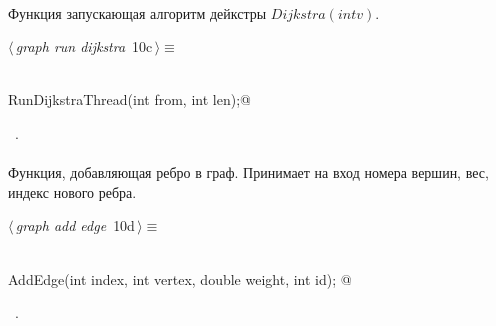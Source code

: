 \documentclass[12pt]{article}
\begin{document}
\paragraph{}
Функция запускающая алгоритм дейкстры $Dijkstra(int v)$.
\begin{flushleft} \small
\begin{minipage}{\linewidth}\label{scrap18}\raggedright\small
{} $\langle\,${\itshape graph run dijkstra}\nobreak\ {\footnotesize {10c}}$\,\rangle\equiv$
\vspace{-1ex}
\begin{list}{}{} \item
\mbox{}\verb@@\\
\mbox{}\verb@void RunDijkstraThread(int from, int len);@\\
\mbox{}\verb@@{\NWsep}
\end{list}
\vspace{-1.5ex}
\footnotesize
\begin{list}{}{\setlength{\itemsep}{-\parsep}\setlength{\itemindent}{-\leftmargin}}
\item \NWtxtMacroRefIn\ .

\item{}
\end{list}
\end{minipage}\vspace{4ex}
\end{flushleft}
\paragraph{}
Функция, добавляющая ребро в граф. Принимает на вход номера вершин, вес, индекс нового ребра.
\begin{flushleft} \small
\begin{minipage}{\linewidth}\label{scrap19}\raggedright\small
{} $\langle\,${\itshape graph add edge}\nobreak\ {\footnotesize {10d}}$\,\rangle\equiv$
\vspace{-1ex}
\begin{list}{}{} \item
\mbox{}\verb@@\\
\mbox{}\verb@void AddEdge(int index, int vertex, double weight, int id);   @\\
\mbox{}\verb@@{\NWsep}
\end{list}
\vspace{-1.5ex}
\footnotesize
\begin{list}{}{\setlength{\itemsep}{-\parsep}\setlength{\itemindent}{-\leftmargin}}
\item \NWtxtMacroRefIn\ .

\item{}
\end{list}
\end{minipage}\vspace{4ex}
\end{flushleft}
\end{document}
